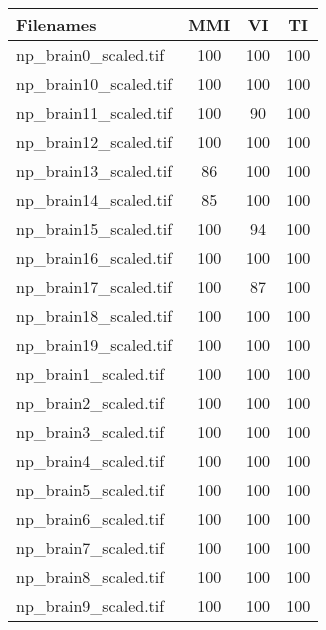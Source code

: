 \begin{tabular}{lccc}
\hline
 Filenames             & MMI & VI  & TI  \\ \hline \hline
 np\_brain0\_scaled.tif  & 100 & 100 & 100 \\
 np\_brain10\_scaled.tif & 100 & 100 & 100 \\
 np\_brain11\_scaled.tif & 100 & 90  & 100 \\
 np\_brain12\_scaled.tif & 100 & 100 & 100 \\
 np\_brain13\_scaled.tif & 86  & 100 & 100 \\
 np\_brain14\_scaled.tif & 85  & 100 & 100 \\
 np\_brain15\_scaled.tif & 100 & 94  & 100 \\
 np\_brain16\_scaled.tif & 100 & 100 & 100 \\
 np\_brain17\_scaled.tif & 100 & 87  & 100 \\
 np\_brain18\_scaled.tif & 100 & 100 & 100 \\
 np\_brain19\_scaled.tif & 100 & 100 & 100 \\
 np\_brain1\_scaled.tif  & 100 & 100 & 100 \\
 np\_brain2\_scaled.tif  & 100 & 100 & 100 \\
 np\_brain3\_scaled.tif  & 100 & 100 & 100 \\
 np\_brain4\_scaled.tif  & 100 & 100 & 100 \\
 np\_brain5\_scaled.tif  & 100 & 100 & 100 \\
 np\_brain6\_scaled.tif  & 100 & 100 & 100 \\
 np\_brain7\_scaled.tif  & 100 & 100 & 100 \\
 np\_brain8\_scaled.tif  & 100 & 100 & 100 \\
 np\_brain9\_scaled.tif  & 100 & 100 & 100 \\
\hline
\end{tabular}